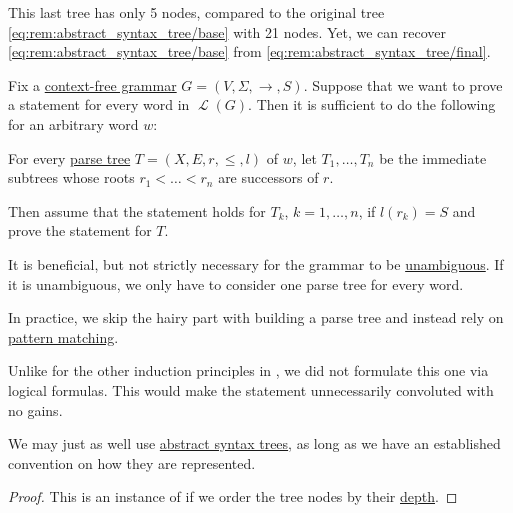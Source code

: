 \begin{remark}
  This last tree has only 5 nodes, compared to the original tree \eqref{eq:rem:abstract_syntax_tree/base} with 21 nodes. Yet, we can recover \eqref{eq:rem:abstract_syntax_tree/base} from \eqref{eq:rem:abstract_syntax_tree/final}.
\end{remark}

\begin{theorem}\label{thm:induction_on_syntax_trees}
  Fix a \hyperref[def:chomsky_hierarchy/context_free]{context-free grammar} \( G = (V, \Sigma, \to, S) \). Suppose that we want to prove a statement for every word in \( \mscrL(G) \). Then it is sufficient to do the following for an arbitrary word \( w \):
  \begin{displayquote}
    For every \hyperref[def:parse_tree]{parse tree} \( T = (X, E, r, \leq, l) \) of \( w \), let \( T_1, \ldots, T_n \) be the immediate subtrees whose roots \( r_1 < \ldots < r_n \) are successors of \( r \).

    Then assume that the statement holds for \( T_k \), \( k = 1, \ldots, n \), if \( l(r_k) = S \) and prove the statement for \( T \).
  \end{displayquote}
\end{theorem}
\begin{comments}
  \item It is beneficial, but not strictly necessary for the grammar to be \hyperref[def:grammar_ambiguity]{unambiguous}. If it is unambiguous, we only have to consider one parse tree for every word.
  \item In practice, we skip the hairy part with building a parse tree and instead rely on \hyperref[rem:evaluation]{pattern matching}.
  \item Unlike for the other induction principles in , we did not formulate this one via logical formulas. This would make the statement unnecessarily convoluted with no gains.
  \item We may just as well use \hyperref[rem:abstract_syntax_tree]{abstract syntax trees}, as long as we have an established convention on how they are represented.
\end{comments}
\begin{proof}
  This is an instance of  if we order the tree nodes by their \hyperref[def:arborescence/depth]{depth}.
\end{proof}


